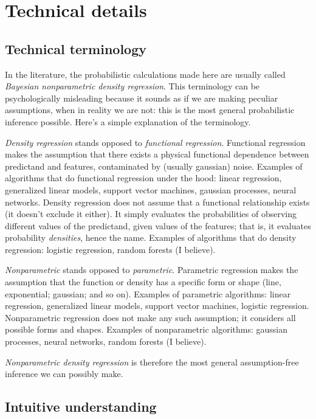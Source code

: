 \documentclass[\ifafour a4paper,12pt,\else a5paper,10pt,\fi%
onecolumn,oneside,article,%
british%
]{memoir}
\theoremstyle{remark}
\theoremstyle{innote}
\renewcommand*{\|}[1][]{\nonscript\:#1\vert\nonscript\:\mathopen{}}
\begin{document}
\section{Technical details}
\label{sec:techdet}

\subsection{Technical terminology}
\label{sec:terminology}

In the literature, the probabilistic calculations made here are usually
called \emph{Bayesian nonparametric density regression}. This terminology
can be psychologically misleading because it sounds as if we are making
peculiar assumptions, when in reality we are not: this is the most general
probabilistic inference possible. Here's a simple explanation of the
terminology.

\emph{Density regression} stands opposed to \emph{functional regression}.
Functional regression makes the assumption that there exists a physical
functional dependence between predictand and features, contaminated by
(usually gaussian) noise. Examples of algorithms that do functional
regression under the hood: linear regression, generalized linear models,
support vector machines, gaussian processes, neural networks. Density
regression does not assume that a functional relationship exists (it
doesn't exclude it either). It simply evaluates the probabilities of
observing different values of the predictand, given values of the features;
that is, it evaluates  probability \emph{densities}, hence the name.
Examples of algorithms that do density regression: logistic regression,
random forests (I believe).

\emph{Nonparametric} stands opposed to \emph{parametric}. Parametric
regression makes the assumption that the function or density has a specific
form or shape (line, exponential; gaussian; and so on). Examples of
parametric algorithms: linear regression, generalized linear models,
support vector machines, logistic regression. Nonparametric regression does
not make any such assumption; it considers all possible forms and shapes.
Examples of nonparametric algorithms: gaussian processes, neural networks,
random forests (I believe).

\emph{Nonparametric density regression} is therefore the most general
assumption-free inference we can possibly make.

\subsection{Intuitive understanding}
\label{sec:understand}
\end{document}
